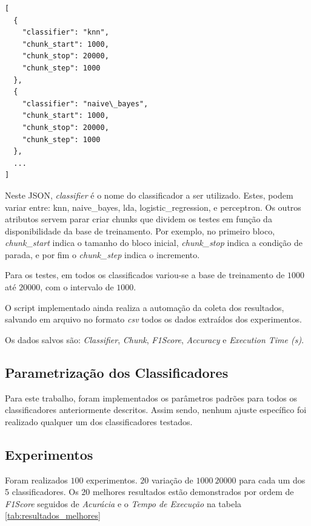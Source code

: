 \documentclass[12pt]{article}
\begin{document}
\begin{lstlisting}[caption={JSON do Orquestrador},captionpos=b,frame=single,label={code:orquestrador}]
[
  {
    "classifier": "knn",
    "chunk_start": 1000,
    "chunk_stop": 20000,
    "chunk_step": 1000
  },
  {
    "classifier": "naive\_bayes",
    "chunk_start": 1000,
    "chunk_stop": 20000,
    "chunk_step": 1000
  },
  ...
]
\end{lstlisting}

Neste JSON, \textit{classifier} é o nome do classificador a ser utilizado. Estes, podem variar entre: knn, naive\_bayes, lda, logistic\_regression, e perceptron. Os outros atributos servem parar criar chunks que dividem os testes em função da disponibilidade da base de treinamento. Por exemplo, no primeiro bloco, \textit{chunk\_start} indica o tamanho do bloco inicial, \textit{chunk\_stop} indica a condição de parada, e por fim o \textit{chunk\_step} indica o incremento.

Para os testes, em todos os classificados variou-se a base de treinamento de $1000$ até $20000$, com o intervalo de $1000$.

O script implementado ainda realiza a automação da coleta dos resultados, salvando em arquivo no formato \textit{csv} todos os dados extraídos dos experimentos.

Os dados salvos são: \textit{Classifier}, \textit{Chunk}, \textit{F1Score}, \textit{Accuracy} e \textit{Execution Time (s)}.

\subsection{Parametrização dos Classificadores}

Para este trabalho, foram implementados os parâmetros padrões para todos os classificadores anteriormente descritos. Assim sendo, nenhum ajuste específico foi realizado qualquer um dos classificadores testados.

\subsection{Experimentos}

Foram realizados $100$ experimentos. $20$ variação de $1000~20000$ para cada um dos 5 classificadores. Os $20$ melhores resultados estão demonstrados por ordem de \textit{F1Score} seguidos de \textit{Acurácia} e o \textit{Tempo de Execução} na tabela \ref{tab:resultados_melhores}
\end{document}
